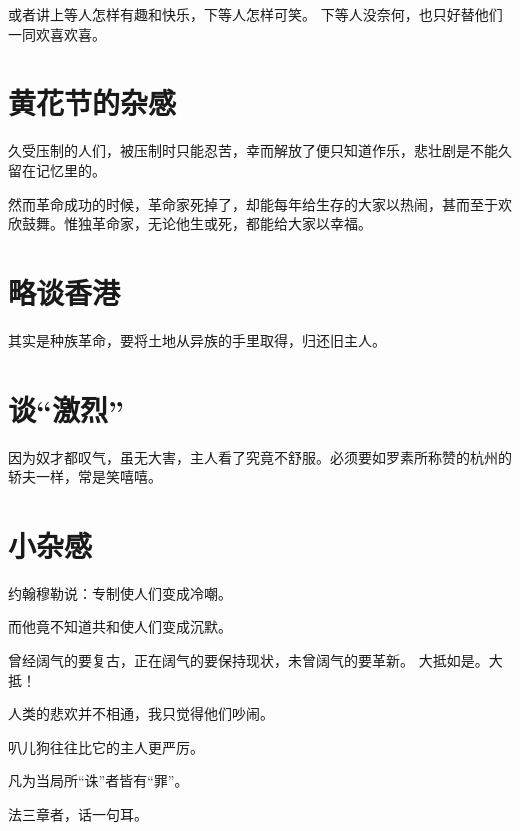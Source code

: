 \documentclass[a4paper]{article}
\begin{document}
或者讲上等人怎样有趣和快乐，下等人怎样可笑。
下等人没奈何，也只好替他们一同欢喜欢喜。

\section{黄花节的杂感}

久受压制的人们，被压制时只能忍苦，幸而解放了便只知道作乐，悲壮剧是不能久留在记忆里的。

然而革命成功的时候，革命家死掉了，却能每年给生存的大家以热闹，甚而至于欢欣鼓舞。惟独革命家，无论他生或死，都能给大家以幸福。

\section{略谈香港}

其实是种族革命，要将土地从异族的手里取得，归还旧主人。

\section{谈“激烈”}

因为奴才都叹气，虽无大害，主人看了究竟不舒服。必须要如罗素所称赞的杭州的轿夫一样，常是笑嘻嘻。

\section{小杂感}
约翰穆勒说：专制使人们变成冷嘲。

而他竟不知道共和使人们变成沉默。
\vspace{1em}

曾经阔气的要复古，正在阔气的要保持现状，未曾阔气的要革新。
大抵如是。大抵！
\vspace{1em}

人类的悲欢并不相通，我只觉得他们吵闹。
\vspace{1em}

叭儿狗往往比它的主人更严厉。
\vspace{1em}

凡为当局所“诛”者皆有“罪”。
\vspace{1em}

法三章者，话一句耳。
\end{document}
